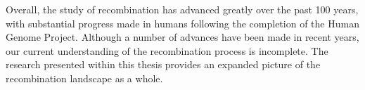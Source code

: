 Overall, the study of recombination has advanced greatly over the past 100 years, with substantial progress made in humans following the completion of the Human Genome Project.
Although a number of advances have been made in recent years, our current understanding of the recombination process is incomplete.
The research presented within this thesis provides an expanded picture of the recombination landscape as a whole.





% 
% 
